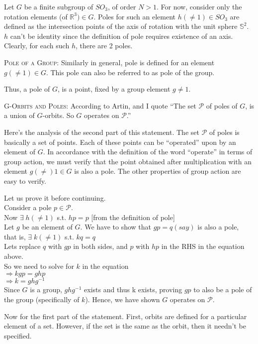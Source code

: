 \documentclass[12pt]{article}
\begin{document}
Let $G$ be a finite subgroup of $SO_{3}$, of order $N > 1$. For now, consider only the rotation elements (of $\mathbb{R}^3) \in G$. Poles for such an element $h(\neq 1) \in SO_{3}$ are defined as the intersection points of the axis of rotation with the unit sphere $\mathbb{S}^2$. $h$ can't be identity since the definition of pole requires existence of an axis. Clearly, for each such $h$, there are 2 poles.
\par
\textsc {Pole of a Group: } Similarly in general, pole is defined for an element $g(\neq 1) \in G$. This pole can also be referred to as pole of the group.
\par
Thus, a pole of $G$, is a point, fixed by a group element $g \neq 1$.\\
\par
\textsc {G-Orbits and Poles: } According to Artin, and I quote ``The set $\mathcal P$ of poles of $G$, is a union of $G$-orbits. So $G$ operates on $\mathcal P$.''
\par
Here's the analysis of the second part of this statement. The set $\mathcal P$ of poles is basically a set of points. Each of these points can be ``operated'' upon by an element of $G$. In accordance with the definition of the word ``operate'' in terms of group action, we must verify that the point obtained after multiplication with an element $g(\neq) 1 \in G$ is also a pole. The other properties of group action are easy to verify.
\par
Let us prove it before continuing.\\ Consider a pole $p \in \mathcal P$.\\
Now $\exists\;h(\neq 1)$ s.t. $hp=p$ \hfill [from the definition of pole]\\
Let $g$ be an element of $G$. We have to show that $gp=q (say)$ is also a pole,\\
that is, $\exists\;k(\neq 1)$ s.t. $kq=q$\\
Lets replace $q$ with $gp$ in both sides, and $p$ with $hp$ in the RHS in the equation above.\\
So we need to solve for $k$ in the equation\\
$\Rightarrow kgp=ghp$\\
$\Rightarrow k=ghg^{-1}$\\
Since $G$ is a group, $ghg^{-1}$ exists and thus k exists, proving $gp$ to also be a pole of the group (specifically of $k$). Hence, we have shown $G$ operates on $\mathcal P$.
\par
Now for the first part of the statement. First, orbits are defined for a particular element of a set. However, if the set is the same as the orbit, then it needn't be specified.\\
\end{document}
